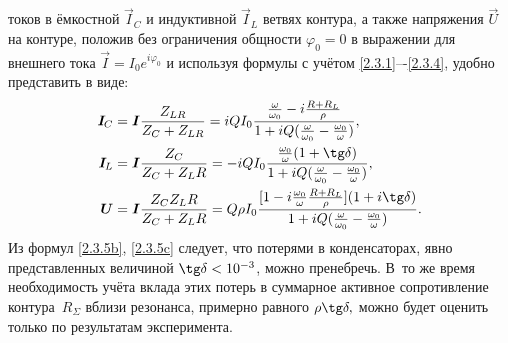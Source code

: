 токов в ёмкостной $\vec{I}_{\! C}$ и индуктивной
$\vec{I}_{\! L}$ ветвях контура, а также напряжения $\vec U$ на контуре, положив без
ограничения общности $\varphi_0=0$ в выражении для внешнего тока $\vec
I=I_0e^{i\varphi_0}$ и используя формулы  с учётом
\eqref{2.3.1}–-\eqref{2.3.4}, удобно представить в виде:
\begin{align}
			\eqmark{2.3.5a}
			\vec{I}_{\! C} &= \vec{I}\dfrac{Z_{LR}}{Z_C+Z_{LR}}=
                iQI_0\dfrac{\frac{\omega}{\omega_0}-i \frac{R+R_L}{\rho}}{%
                        1+iQ(\frac{\omega}{\omega_0}-\frac{\omega_0}{\omega})}, \\
			\eqmark{2.3.5b}
			\vec{I}_{\! L}&=\vec{I}\dfrac{Z_C}{Z_C+Z_LR}=
                -iQI_0\dfrac{\frac{\omega_0}{\omega}(1+\tg\delta)}{%
                    1+iQ(\frac{\omega}{\omega_0}-\frac{\omega_0}{\omega})}, \\
			\eqmark{2.3.5c}
			\vec U&=\vec{I}\dfrac{Z_C Z_LR}{Z_C+Z_LR}= 
                Q\rho I_0 \dfrac{[1-i\frac{\omega_0}{\omega}\frac{R+R_L}{\rho}](1+i\tg\delta)}{%
                    1+iQ(\frac{\omega}{\omega_0}-\frac{\omega_0}{\omega})}.
\end{align}
Из формул \eqref{2.3.5b}, \eqref{2.3.5c} следует, что потерями в конденсаторах,
явно представленных величиной $\tg\delta<10^{-3}$, можно пренебречь. 
В~то же время необходимость учёта вклада этих потерь в
суммарное активное сопротивление контура~$R_{\Sigma}$ 
вблизи резонанса, примерно равного $\rho\tg\delta,$ можно будет оценить только по
результатам эксперимента.

